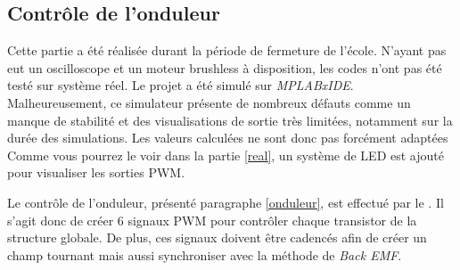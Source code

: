 			\subsection{Contrôle de l'onduleur}			
			\begin{tcolorbox}[center,width=0.9\textwidth, colframe=red!90!orange, colback=orange!25, arc=3mm,boxrule=1mm, sharp corners=east,title=Note]
			Cette partie a été réalisée durant la période de fermeture de l'école. N'ayant pas eut un oscilloscope et un moteur brushless à disposition, les codes n'ont pas été testé sur système réel. Le projet a été simulé sur \textit{MPLABxIDE}. Malheureusement, ce simulateur présente de nombreux défauts comme un manque de stabilité et des visualisations de sortie très limitées, notamment sur la durée des simulations. Les valeurs calculées ne sont donc pas forcément adaptées\\
  			Comme vous pourrez le voir dans la partie \ref{real}, un système de LED est ajouté pour visualiser les sorties PWM. 
  			\end{tcolorbox}
  			Le contrôle de l'onduleur, présenté paragraphe \ref{onduleur}, est effectué par le \dspic . Il s'agit donc de créer 6 signaux  PWM pour contrôler chaque transistor de la structure globale. De plus, ces signaux doivent être cadencés afin de créer un champ tournant mais aussi synchroniser avec la méthode de \textit{Back EMF}.
